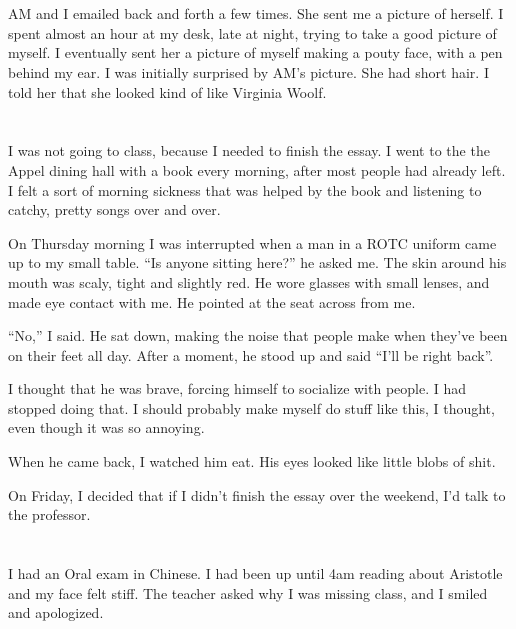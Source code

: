 \section{}

AM and I emailed back and forth a few times.  She sent me a picture of herself.
I spent almost an hour at my desk, late at night, trying to take a good picture
of myself.  I eventually sent her a picture of myself making a pouty face, with
a pen behind my ear.  I was initially surprised by AM's picture.  She had short
hair.  I told her that she looked kind of like Virginia Woolf.  

\section{}

I was not going to class, because I needed to finish the essay.  I went to the
the Appel dining hall with a book every morning, after most people had already
left.  I felt a sort of morning sickness that was helped by the book and
listening to catchy, pretty songs over and over.  

On Thursday morning I was interrupted when a man in a ROTC uniform came up to my
small table.  ``Is anyone sitting here?'' he asked me.  The skin around his
mouth was scaly, tight and slightly red.  He wore glasses with small lenses, and
made eye contact with me.  He pointed at the seat across from me.  

``No,'' I said.  He sat down, making the noise that people make when they've
been on their feet all day.  After a moment, he stood up and said ``I'll be
right back''.  

I thought that he was brave, forcing himself to socialize with people.  I had
stopped doing that.  I should probably make myself do stuff like this, I
thought, even though it was so annoying. 

When he came back, I watched him eat.  His eyes looked like little blobs of
shit.

On Friday, I decided that if I didn't finish the essay over the weekend, I'd
talk to the professor.

\section{}

I had an Oral exam in Chinese.  I had been up until 4am reading about Aristotle
and my face felt stiff.  The teacher asked why I was missing class, and I smiled
and apologized.

